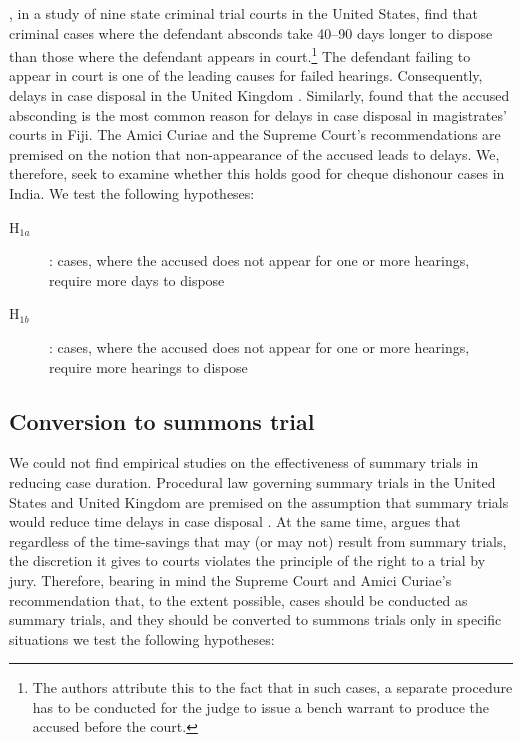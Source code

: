 \begin{enumerate}
\begin{enumerate}
\textcite{ostrom2000efficiency}, in a study of nine state criminal trial courts in the United States, find that criminal cases where the defendant absconds take 40--90 days longer to dispose than those where the defendant appears in court.\footnote{The authors attribute this to the fact that in such cases, a separate procedure has to be conducted for the judge to issue a bench warrant to produce the accused before the court.} The defendant failing to appear in court is one of the leading causes for failed hearings. Consequently, delays in case disposal in the United Kingdom \autocite{crownProsecutionService2006_magistrateCourtEfficiency}. Similarly, \textcite{llangasinghe1988_fijiJudicialDelays} found that the accused absconding is the most common reason for delays in case disposal in magistrates' courts in Fiji. The Amici Curiae and the Supreme Court's recommendations are premised on the notion that non-appearance of the accused leads to delays. We, therefore, seek to examine whether this holds good for cheque dishonour cases in India. We test the following hypotheses:

\begin{description}
\item[H$_{1a}$]: cases, where the accused does not appear for one or more hearings, require more days to dispose
\item[H$_{1b}$]: cases, where the accused does not appear for one or more hearings, require more hearings to dispose
\end{description}

\subsection{Conversion to summons trial}
\label{sec:conv-summ-trial}

We could not find empirical studies on the effectiveness of summary trials in reducing case duration. Procedural law governing summary trials in the United States and United Kingdom are premised on the assumption that summary trials would reduce time delays in case disposal \autocite{miller2003}. At the same time, \textcite{miller2003} argues that regardless of the time-savings that may (or may not) result from summary trials, the discretion it gives to courts violates the principle of the right to a trial by jury. Therefore, bearing in mind the Supreme Court and Amici Curiae's recommendation that, to the extent possible, cases should be conducted as summary trials, and they should be converted to summons trials only in specific situations we test the following hypotheses:


\end{enumerate}
\end{enumerate}
